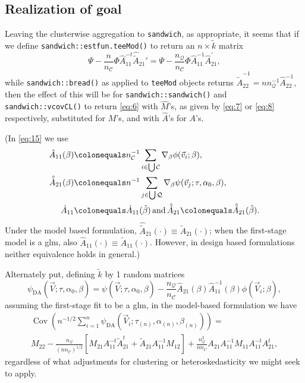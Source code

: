 \documentclass{article}
\newcommand{\defeq}{\ensuremath{\colonequals}}
\begin{document}
\subsection{Realization of goal} \label{sec:realization-goal}
Leaving the clusterwise aggregation to \texttt{sandwich}, as
appropriate, it seems that if we define
\texttt{sandwich::estfun.teeMod()} to return an $n \times \tilde{k}$ matrix
\begin{equation} \label{eq:15}
  \Psi -
  \frac{n}{n_{\mathcal{C}}}\Phi
  \hat{A}_{11}^{-t}\hat{\tilde{A}}_{21}' = \Psi -
 \frac{n_{\mathcal{Q}}}{n_{\mathcal{C}}}\Phi
 \hat{A}_{11}^{-1}\hat{A}_{21}^{\prime},
\end{equation}
while \texttt{sandwich::bread()} as applied to
\texttt{teeMod} objects returns $\hat{\tilde{A}}_{22}^{-1} = nn_{\mathcal{Q}}^{-1}\hat{A}_{22}^{-1}$, then the effect of this will be for \texttt{sandwich::sandwich()}
and \texttt{sandwich::vcovCL()} to return \eqref{eq:6} with
$\hat{M}$'s,  as
given by \eqref{eq:7} or \eqref{eq:8} respectively, substituted for
$M$'s, and with $\hat{A}$'s for $A$'s.

(In \eqref{eq:15}
we use
\begin{align*}
  \hat{A}_{11}(\beta) &\defeq  n_{\mathcal{C}}^{-1}\sum_{i\in \bigcup
        \mathcal{C}}\nabla_{\beta}\phi(\vec{v}_{i};
        \beta ),\\
  \hat{\tilde{A}}_{21}(\beta) &\defeq n^{-1}\sum_{j\in \bigcup
        \mathcal{Q}}\nabla_{\beta}\psi(\vec{v}_{j};
        \tau, \alpha_{0}, \beta ),\\
  \hat{A}_{11}&\defeq \hat{A}_{11}(\hat\beta)\, \text{and}\, \hat{\tilde{A}}_{21}\defeq \hat{\tilde{A}}_{21}(\hat\beta).
\end{align*}
Under the model based
formulation, $\hat{\tilde{A}}_{21}(\cdot) \equiv \tilde{A}_{21}(\cdot)$; when the
first-stage model is a glm, also $\hat{A}_{11}(\cdot) \equiv
\tilde{A}_{11}(\cdot)$.  However, in design based formulations neither
equivalence holds in general.)

Alternately put,
defining $\tilde{k}$ by 1 random matrices
\begin{equation}\label{eq:10}
    \psi_\text{DA}(\vec{V}; \tau, \alpha_{0},
    \beta) = \psi (\vec{V}; \tau,\alpha_{0},
    \beta) -
    \frac{n_{\mathcal{Q}}}{n_{\mathcal{C}}}
    \hat{{A}}_{21}(\beta) \hat{A}_{11}^{-1}(\beta)\phi(\vec{V}_{i};
    \beta),
\end{equation}
assuming the first-stage fit to be a glm, in the model-based formulation we have
\begin{multline}
  \operatorname{Cov}\left(n^{-1/2}\sum_{i=1}^{n} \psi_\text{DA}(\vec{V}_{i}; \tau_{(n)},\alpha_{(n)},
    \beta_{(n)})\right) = \\
  M_{22} -
                                 \frac{n_{\mathcal{Q}}}{(n n_{\mathcal{C}})^{1/2}}[M_{21}A_{11}^{-t}\tilde{A}_{21}^t
                                 + \tilde{A}_{21}A_{11}^{-1}M_{12}] +
                                 \frac{n_{\mathcal{Q}}^{2}}{nn_C}{A}_{21}A_{11}^{-1}M_{11}A_{11}^{-t}{A}_{21}^{t}, \label{eq:12}
                               \end{multline}
regardless of what adjustments for
clustering or heteroskedasticity we might seek to apply.
\end{document}
